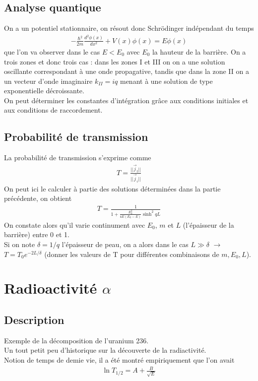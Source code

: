 \documentclass[12pt,prb,aps,epsf]{article}
\begin{document}
\subsection{Analyse quantique}
On a un potentiel stationnaire, on résout donc Schrödinger indépendant du temps 
\begin{eqnarray}
-\frac{\hbar^2}{2m}\frac{d^2 \phi(x)}{d x^2} + V(x)\phi(x) = E\phi(x)
\end{eqnarray}
que l'on va observer dans le cas $E<E_0$ avec $E_0$ la hauteur de la barrière. On a trois zones et donc trois cas : dans les zones I et III on on a une solution oscillante correspondant à une onde propagative, tandis que dans la zone II on a un vecteur d'onde imaginaire $k_{II} = iq$ menant à une solution de type exponentielle décroissante.\\
On peut déterminer les constantes d'intégration grâce aux conditions initiales et aux conditions de raccordement.

\subsection{Probabilité de transmission}
La probabilité de transmission s'exprime comme
\begin{eqnarray}
T = \frac{||\vec{j}_t||}{||\vec{j}_i||}
\end{eqnarray}
On peut ici le calculer à partie des solutions déterminées dans la partie précédente, on obtient 
\begin{eqnarray}
T = \frac{1}{1 + \frac{E_0^2}{4E(E_0-E)}\sinh^2qL}
\end{eqnarray}
On constate alors qu'il varie continument avec $E_0$, $m$ et $L$ (l'épaisseur de la barrière) entre 0 et 1.\\

Si on note $\delta = 1/q$ l'épaisseur de peau, on a alors dans le cas  $L\gg \delta$ $\longrightarrow$ $T=T_0 e^{-2L/\delta}$ (donner les valeurs de T pour différentes combinaisons de $m, E_0, L$).

\section{Radioactivité $\alpha$}
\subsection{Description}
Exemple de la décomposition de l'uranium 236.\\
Un tout petit peu d'historique sur la découverte de la radiactivité.\\
Notion de temps de demie vie, il a été montré empiriquement que l'on avait 
\begin{eqnarray}
\ln T_{1/2} = A + \frac{B}{\sqrt{E}} \label{t}
\end{eqnarray}
\end{document}
